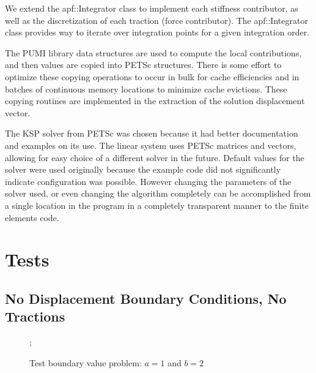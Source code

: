 \documentclass{article}
\begin{document}
We extend the apf::Integrator class to implement each stiffness contributor, as well as the discretization of each traction (force contributor). The apf::Integrator class provides way to iterate over integration points for a given integration order.

The PUMI library data structures are used to compute the local contributions, and then values are copied into PETSc structures. There is some effort to optimize these copying operations to occur in bulk for cache efficiencies and in batches of continuous memory locations to minimize cache evictions. These copying routines are implemented in the extraction of the solution displacement vector.


The KSP solver from PETSc was chosen because it had better documentation and examples on its use. The linear system uses PETSc matrices and vectors, allowing for easy choice of a different solver in the future. Default values for the solver were used originally because the example code did not significantly indicate configuration was possible. However changing the parameters of the solver used, or even changing the algorithm completely can be accomplished from a single location in the program in a completely transparent manner to the finite elements code.

\section{Tests}

\subsection{No Displacement Boundary Conditions, No Tractions}
\FloatBarrier

\begin{figure}
    ;
    \caption{Test boundary value problem: $a = 1$ and $b = 2$}
\centering
\end{figure}
\end{document}
